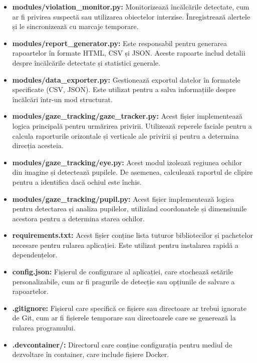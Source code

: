 \documentclass[12pt,a4paper]{article}
\begin{document}
\begin{itemize}
    \item \textbf{modules/violation\_monitor.py:} Monitorizează încălcările detectate, cum ar fi privirea suspectă sau utilizarea obiectelor interzise. Înregistrează alertele și le sincronizează cu marcaje temporare.

    \item \textbf{modules/report\_generator.py:} Este responsabil pentru generarea rapoartelor în formate HTML, CSV și JSON. Aceste rapoarte includ detalii despre încălcările detectate și statistici generale.

    \item \textbf{modules/data\_exporter.py:} Gestionează exportul datelor în formatele specificate (CSV, JSON). Este utilizat pentru a salva informațiile despre încălcări într-un mod structurat.
    
    \item \textbf{modules/gaze\_tracking/gaze\_tracker.py:} Acest fișier implementează logica principală pentru urmărirea privirii. Utilizează reperele faciale pentru a calcula raporturile orizontale și verticale ale privirii și pentru a determina direcția acesteia.

    \item \textbf{modules/gaze\_tracking/eye.py:} Acest modul izolează regiunea ochilor din imagine și detectează pupilele. De asemenea, calculează raportul de clipire pentru a identifica dacă ochiul este închis.

    \item \textbf{modules/gaze\_tracking/pupil.py:} Acest fișier implementează logica pentru detectarea și analiza pupilelor, utilizând coordonatele și dimensiunile acestora pentru a determina starea ochilor.

    \item \textbf{requirements.txt:} Acest fișier conține lista tuturor bibliotecilor și pachetelor necesare pentru rularea aplicației. Este utilizat pentru instalarea rapidă a dependențelor.

    \item \textbf{config.json:} Fișierul de configurare al aplicației, care stochează setările personalizabile, cum ar fi pragurile de detecție sau opțiunile de salvare a rapoartelor.

    \item \textbf{.gitignore:} Fișierul care specifică ce fișiere sau directoare ar trebui ignorate de Git, cum ar fi fișierele temporare sau directoarele care se generează la rularea programului.

    \item \textbf{.devcontainer/:} Directorul care conține configurația pentru mediul de dezvoltare în container, care include fișiere Docker.
\end{itemize}
\end{document}
